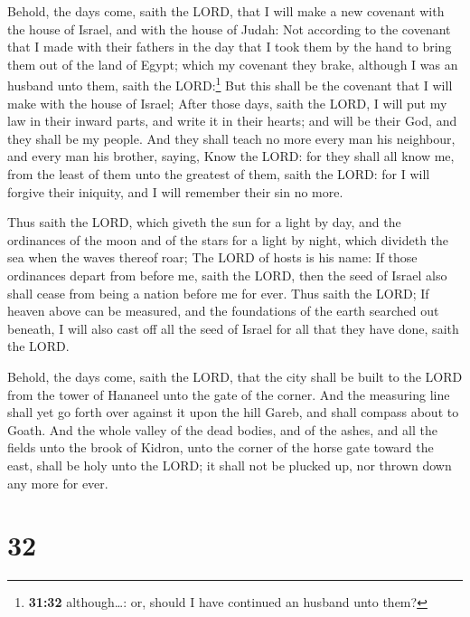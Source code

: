  Behold, the days come, saith the LORD, that I will make
a new covenant with the house of Israel, and with the house of Judah:
 Not according to the covenant that I made with their
fathers in the day that I took them by the hand to bring them out of the
land of Egypt; which my covenant they brake, although I was an husband
unto them, saith the LORD:\footnote{\textbf{31:32} although\ldots: or,
  should I have continued an husband unto them?}  But
this shall be the covenant that I will make with the house of Israel;
After those days, saith the LORD, I will put my law in their inward
parts, and write it in their hearts; and will be their God, and they
shall be my people.  And they shall teach no more every
man his neighbour, and every man his brother, saying, Know the LORD: for
they shall all know me, from the least of them unto the greatest of
them, saith the LORD: for I will forgive their iniquity, and I will
remember their sin no more.

 Thus saith the LORD, which giveth the sun for a light by
day, and the ordinances of the moon and of the stars for a light by
night, which divideth the sea when the waves thereof roar; The LORD of
hosts is his name:  If those ordinances depart from
before me, saith the LORD, then the seed of Israel also shall cease from
being a nation before me for ever.  Thus saith the LORD;
If heaven above can be measured, and the foundations of the earth
searched out beneath, I will also cast off all the seed of Israel for
all that they have done, saith the LORD.

 Behold, the days come, saith the LORD, that the city
shall be built to the LORD from the tower of Hananeel unto the gate of
the corner.  And the measuring line shall yet go forth
over against it upon the hill Gareb, and shall compass about to Goath.
 And the whole valley of the dead bodies, and of the
ashes, and all the fields unto the brook of Kidron, unto the corner of
the horse gate toward the east, shall be holy unto the LORD; it shall
not be plucked up, nor thrown down any more for ever.

\hypertarget{section-31}{%
\section{32}\label{section-31}}

